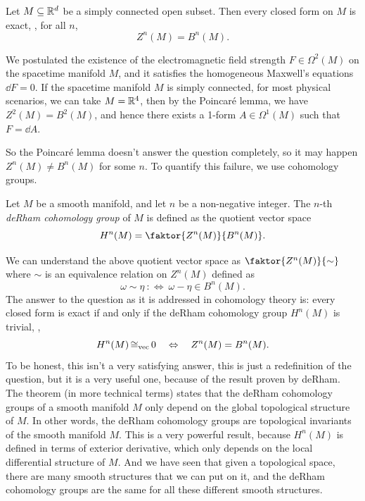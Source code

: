 \begin{lemma}
    Let \(M \subseteq \mathbb R^d\) be a simply connected open subset. Then every closed form on \(M\) is exact, \ie, for all \(n\),
    \begin{equation*}
        Z^n(M) = B^n(M).
    \end{equation*}
\end{lemma}
\begin{example}
    We postulated the existence of the electromagnetic field strength \(F \in \Omega^2(M)\) on the spacetime manifold \(M\), and it satisfies the homogeneous Maxwell's equations \(\dd F = 0\). If the spacetime manifold \(M\) is simply connected, for most physical scenarios, we can take \(M = \mathbb R^4\), then by the Poincar\'e lemma, we have \(Z^2(M) = B^2(M)\), and hence there exists a 1-form \(A \in \Omega^1(M)\) such that \(F = \dd A\).
\end{example}
So the Poincar\'e lemma doesn't answer the question completely, so it may happen \(Z^n(M) \neq B^n(M)\) for some \(n\). To quantify this failure, we use cohomology groups.
\begin{definition}
    Let \(M\) be a smooth manifold, and let \(n\) be a non-negative integer. The \(n\)-th \emph{deRham cohomology group} of \(M\) is defined as the quotient vector space
    \begin{equation*}
        H^n(M) = \faktor{Z^n(M)}{B^n(M)}.
    \end{equation*}
\end{definition}
We can understand the above quotient vector space as \(\faktor{Z^n(M)}{\sim}\) where \(\sim\) is an equivalence relation on \(Z^n(M)\) defined as
\begin{equation*}
    \omega \sim \eta \ :\iff\  \omega - \eta \in B^n(M).
\end{equation*}
The answer to the question as it is addressed in cohomology theory is: every closed form is exact if and only if the deRham cohomology group \(H^n(M)\) is trivial, \ie,
\begin{equation*}
    H^n(M) \operatorname{\mathrel{\cong_{\text{vec}}}} 0 \quad \Leftrightarrow \quad Z^n(M) = B^n(M).
\end{equation*}
To be honest, this isn't a very satisfying answer, this is just a redefinition of the question, but it is a very useful one, because of the result proven by deRham. The theorem (in more technical terms) states that the deRham cohomology groups of a smooth manifold \(M\) only depend on the global topological structure of \(M\). In other words, the deRham cohomology groups are topological invariants of the smooth manifold \(M\). This is a very powerful result, because \(H^n(M)\) is defined in terms of exterior derivative, which only depends on the local differential structure of \(M\). And we have seen that given a topological space, there are many smooth structures that we can put on it, and the deRham cohomology groups are the same for all these different smooth structures.
